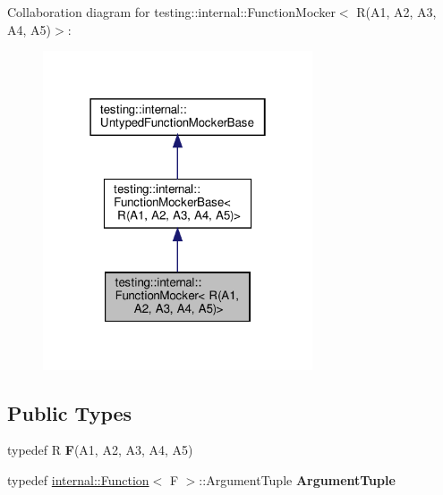 Collaboration diagram for testing\+:\+:internal\+:\+:Function\+Mocker$<$ R(A1, A2, A3, A4, A5)$>$\+:
\nopagebreak
\begin{figure}[H]
\begin{center}
\leavevmode
\includegraphics[width=226pt]{classtesting_1_1internal_1_1_function_mocker_3_01_r_07_a1_00_01_a2_00_01_a3_00_01_a4_00_01_a5_08_4__coll__graph}
\end{center}
\end{figure}
\subsection*{Public Types}
\begin{DoxyCompactItemize}
\item 
\mbox{\label{classtesting_1_1internal_1_1_function_mocker_3_01_r_07_a1_00_01_a2_00_01_a3_00_01_a4_00_01_a5_08_4_a26144c33c64b0af26a1d0c43806a0370}} 
typedef R {\bfseries F}(A1, A2, A3, A4, A5)
\item 
\mbox{\label{classtesting_1_1internal_1_1_function_mocker_3_01_r_07_a1_00_01_a2_00_01_a3_00_01_a4_00_01_a5_08_4_ac82403b3f3e4e65797bb633ade91a43e}} 
typedef \hyperlink{structtesting_1_1internal_1_1_function}{internal\+::\+Function}$<$ F $>$\+::Argument\+Tuple {\bfseries Argument\+Tuple}
\end{DoxyCompactItemize}
